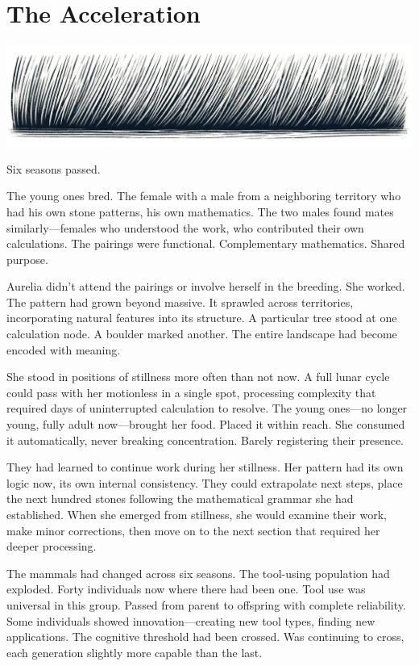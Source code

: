 \chapter{The Acceleration}
\label{ch:08}



\begin{center}
\includegraphics[width=\textwidth]{images/chapterImages/genesis_sketch_00075_.png}
\end{center}

Six seasons passed.

The young ones bred. The female with a male from a neighboring territory who had his own stone patterns, his own mathematics. The two males found mates similarly—females who understood the work, who contributed their own calculations. The pairings were functional. Complementary mathematics. Shared purpose.

Aurelia didn't attend the pairings or involve herself in the breeding. She worked. The pattern had grown beyond massive. It sprawled across territories, incorporating natural features into its structure. A particular tree stood at one calculation node. A boulder marked another. The entire landscape had become encoded with meaning.

She stood in positions of stillness more often than not now. A full lunar cycle could pass with her motionless in a single spot, processing complexity that required days of uninterrupted calculation to resolve. The young ones—no longer young, fully adult now—brought her food. Placed it within reach. She consumed it automatically, never breaking concentration. Barely registering their presence.

They had learned to continue work during her stillness. Her pattern had its own logic now, its own internal consistency. They could extrapolate next steps, place the next hundred stones following the mathematical grammar she had established. When she emerged from stillness, she would examine their work, make minor corrections, then move on to the next section that required her deeper processing.

The mammals had changed across six seasons. The tool-using population had exploded. Forty individuals now where there had been one. Tool use was universal in this group. Passed from parent to offspring with complete reliability. Some individuals showed innovation—creating new tool types, finding new applications. The cognitive threshold had been crossed. Was continuing to cross, each generation slightly more capable than the last.

